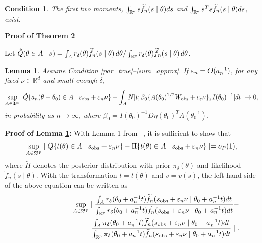 \documentclass{article}
\newtheorem{lemma}{Lemma}
\newtheorem{condition}{Condition}
\begin{document}
\begin{condition} \label{cond:likelihood_moments}
	The first two moments, $\int_{\mathbb{R}^{d}}s\widetilde{f}_{n}(s\mid\theta)ds$
	and $\int_{\mathbb{R}^d}s^{T}s\widetilde{f}_{n}(s\mid\theta)ds$, exist. 
\end{condition}


{\bf Proof of Theorem 2}

\noindent Let $\tilde{Q}(\theta\in A\mid s)=\int_{A}r_{\delta}(\theta)\widetilde{f}_{n}(s\mid\theta)\,d\theta/\int_{\mathbb{R}^{p}}r_{\delta}(\theta)\widetilde{f}_{n}(s\mid\theta)\,d\theta$. 

\begin{lemma}\label{Alemma1} Assume Condition \ref{par_true}--\ref{sum_approx}. If $\varepsilon_{n}=O(a_{n}^{-1})$, for any fixed $\nu\in\mathbb{R}^{d}$
	and small enough $\delta$, 
	\[
	\sup_{A\in\mathfrak{B}^{p}}\left|\tilde{Q}\{a_{n}(\theta-\theta_{0})\in A\mid s_{\rm obs}+\varepsilon_{n}\nu\}-\int_{A}N[t;\beta_{0}\{A(\theta_{0})^{1/2}W_{\rm obs}+c_{\varepsilon}\nu\},I(\theta_{0})^{-1}]dt\right|\rightarrow0,
	\]
	in probability as $n\rightarrow\infty$, where $\beta_{0}=I(\theta_{0})^{-1}D\eta(\theta_{0})^{T}A(\theta_{0}^{-1})$.
\end{lemma}
{\bf Proof of Lemma \ref{Alemma1}:} 
	With Lemma 1 from ~\cite{Li2017}, it is sufficient to show that 
	\[
	\sup_{A\in\mathfrak{B}^{p}}\mid\tilde{Q}\{t(\theta)\in A\mid s_{\rm obs}+\varepsilon_{n}\nu\}-\tilde{\Pi}\{t(\theta)\in A\mid s_{\rm obs}+\varepsilon_{n}\nu\}\mid=o_{P}(1),
	\]
	where $\tilde{\Pi}$ denotes the posterior distribution with prior $\pi_{\delta}(\theta)$ and likelihood $\tilde{f}_n(s \mid \theta)$. 
With the transformation $t=t(\theta)$
	and $v=v(s)$, the left hand side of the above equation can be written
	as 
	\begin{eqnarray}
	&&\sup_{A\in\mathfrak{B}^{p}}\mid\frac{\int_{A}r_{\delta}(\theta_0+a_{n}^{-1}t)\ftil_{n}(s_{{\rm obs}}+\veps_{n}\nu\mid\theta_0+a_{n}^{-1}t)dt}{\int_{\mathbb{R}^{p}}r_{\delta}(\theta_0+a_{n}^{-1}t)\ftil_{n}(s_{{\rm obs}}+\veps_{n}\nu\mid\theta_0+a_{n}^{-1}t)dt}-\hfill \\ \notag
	&&\hspace{3cm}\frac{\int_{A}\pi_{\delta}(\theta_0+a_{n}^{-1}t)\ftil_{n}(s_{{\rm obs}}+\veps_{n}\nu\mid\theta_0+a_{n}^{-1}t)dt}{\int_{\mathbb{R}^{p}}\pi_{\delta}(\theta_0+a_{n}^{-1}t)\ftil_{n}(s_{{\rm obs}}+\veps_{n}\nu\mid\theta_0+a_{n}^{-1}t)dt}\mid.\label{eq1}
	\end{eqnarray}
\end{document}
